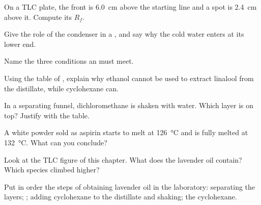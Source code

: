\begin{exercise}[$\star$]\label{exo:g10:chemical-species:3}
On a TLC plate, the  front is \qty{6.0}{cm} above the starting line
and a spot is \qty{2.4}{cm} above it. Compute its $R_f$.
\end{exercise}

\begin{exercise}[$\star$]\label{exo:g10:chemical-species:4}
Give the role of the condenser in a , and say why the cold
water enters at its lower end.
\end{exercise}

\begin{exercise}[$\star$]\label{exo:g10:chemical-species:5}
Name the three conditions an   must meet.
\end{exercise}

\begin{exercise}[$\star\star$]\label{exo:g10:chemical-species:6}
Using the table of , explain why ethanol cannot be used to
extract linalool from the distillate, while cyclohexane can.
\end{exercise}

\begin{exercise}[$\star\star$]\label{exo:g10:chemical-species:7}
In a separating funnel, dichloromethane is shaken with water. Which layer
is on top? Justify with the table.
\end{exercise}

\begin{exercise}[$\star\star$]\label{exo:g10:chemical-species:8}
A white powder sold as aspirin starts to melt at \qty{126}{\celsius} and
is fully melted at \qty{132}{\celsius}. What can you conclude?
\end{exercise}

\begin{exercise}[$\star\star$]\label{exo:g10:chemical-species:9}
Look at the TLC figure of this chapter. What does the lavender oil
contain? Which species climbed higher?
\end{exercise}

\begin{exercise}[$\star\star$]\label{exo:g10:chemical-species:10}
Put in order the steps of obtaining lavender oil in the laboratory:
separating the layers; ; adding cyclohexane to the
distillate and shaking;  the cyclohexane.
\end{exercise}

